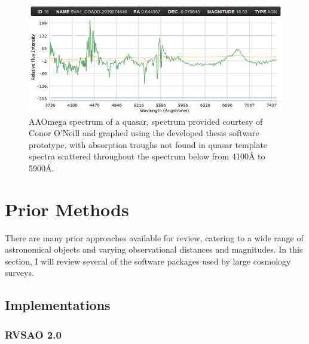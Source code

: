 \documentclass[titlesmallcaps, examinerscopy, copyrightpage]{uqthesis}
\begin{document}
\begin{figure}[ht!]
\includegraphics[width=1\textwidth]{images/dust.PNG} 
\centering
\caption{AAOmega spectrum of a quasar, spectrum provided courtesy of Conor O'Neill and graphed using the developed thesis software prototype, with absorption troughs not found in quasar template spectra scattered throughout the spectrum below from 4100{\AA} to 5900{\AA}.}
\label{fig:dust}
\end{figure}































\chapter{Prior Methods}
\label{ch:prior}

There are many prior approaches available for review, catering to a wide range of astronomical objects and varying observational distances and magnitudes. In this section, I will review several of the software packages used by large cosmology surveys.

\section{Implementations}

\subsection{RVSAO 2.0}
\end{document}
